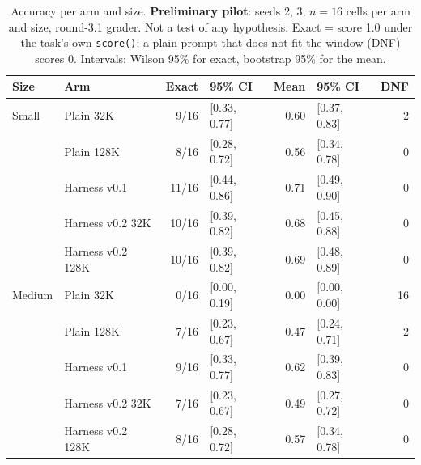 \begin{table}[t]
\centering\small
\caption{Accuracy per arm and size. \textbf{Preliminary pilot}: seeds 2, 3, $n{=}16$ cells per arm and size, round-3.1 grader. Not a test of any hypothesis. Exact = score 1.0 under the task's own \texttt{score()}; a plain prompt that does not fit the window (DNF) scores 0. Intervals: Wilson 95\% for exact, bootstrap 95\% for the mean.}
\label{tab:pilot-accuracy}
\begin{tabular}{llrlrlr}
\toprule
Size & Arm & Exact & 95\% CI & Mean & 95\% CI & DNF \\
\midrule
Small & Plain 32K & 9/16 & [0.33, 0.77] & 0.60 & [0.37, 0.83] & 2 \\
 & Plain 128K & 8/16 & [0.28, 0.72] & 0.56 & [0.34, 0.78] & 0 \\
 & Harness v0.1 & 11/16 & [0.44, 0.86] & 0.71 & [0.49, 0.90] & 0 \\
 & Harness v0.2 32K & 10/16 & [0.39, 0.82] & 0.68 & [0.45, 0.88] & 0 \\
 & Harness v0.2 128K & 10/16 & [0.39, 0.82] & 0.69 & [0.48, 0.89] & 0 \\
\midrule
Medium & Plain 32K & 0/16 & [0.00, 0.19] & 0.00 & [0.00, 0.00] & 16 \\
 & Plain 128K & 7/16 & [0.23, 0.67] & 0.47 & [0.24, 0.71] & 2 \\
 & Harness v0.1 & 9/16 & [0.33, 0.77] & 0.62 & [0.39, 0.83] & 0 \\
 & Harness v0.2 32K & 7/16 & [0.23, 0.67] & 0.49 & [0.27, 0.72] & 0 \\
 & Harness v0.2 128K & 8/16 & [0.28, 0.72] & 0.57 & [0.34, 0.78] & 0 \\
\bottomrule
\end{tabular}
\end{table}
